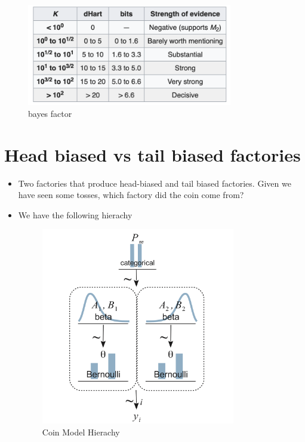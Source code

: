\documentclass{article}
\begin{document}
\begin{itemize}
        \begin{figure}[H]
            \centering
            \includegraphics[width=0.8\textwidth]{bayes_factor}
            \caption{bayes factor}
            \label{fig:bayes_factor}
        \end{figure} 
\end{itemize}
\section{Head biased vs tail biased factories}
\begin{itemize}
    \item Two factories that produce head-biased and tail biased factories. Given we have seen some tosses, which factory did the coin come from?
    \item We have the following hierachy
        \begin{figure}[H]
            \centering
            \includegraphics[width=0.8\textwidth]{coin_model_hierachy}
            \caption{Coin Model Hierachy}
            \label{fig:coin_model_hierachy}
        \end{figure}
\end{itemize}
\end{document}
